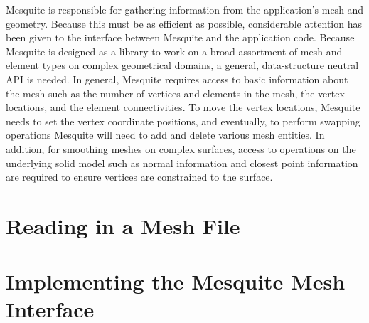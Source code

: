 \documentclass[letter]{report}
\begin{document}
Mesquite is responsible for gathering information from the
application's mesh and geometry.  Because this must be as efficient as
possible, considerable attention has been given to the interface
between Mesquite and the application code.  Because Mesquite is
designed as a library to work on a broad assortment of mesh and
element types on complex geometrical domains, a general,
data-structure neutral API is needed.  In general, Mesquite requires
access to basic information about the mesh such as the number of
vertices and elements in the mesh, the vertex locations, and the
element connectivities.  To move the vertex locations, Mesquite needs
to set the vertex coordinate positions, and eventually, to perform
swapping operations Mesquite will need to add and delete various mesh
entities.  In addition, for smoothing meshes on complex surfaces,
access to operations on the underlying solid model such as normal
information and closest point information are required to ensure
vertices are constrained to the surface.

\section{Reading in a Mesh File}


\section{Implementing the Mesquite Mesh Interface}

%
%
\end{document}
